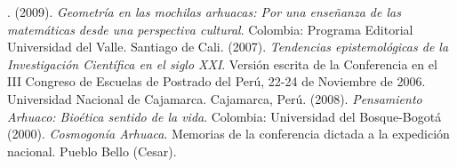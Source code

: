 \begin{titlepage}
\begin{minipage}{0.85\linewidth}
\end{minipage}
\vspace{5pt}
\begin{thebibliography}{99}
. (2009).  {\it Geometr\'ia en las mochilas arhuacas: Por una ense\~nanza de las matem\'aticas desde una perspectiva cultural}.  Colombia: Programa Editorial Universidad del Valle. Santiago de Cali.
 (2007).  {\it Tendencias epistemol\'ogicas de la Investigaci\'on Cient\'ifica en el siglo XXI}.  Versi\'on escrita de la Conferencia en el III Congreso de Escuelas de Postrado del Per\'u, 22-24 de Noviembre de 2006.  Universidad Nacional de Cajamarca.  Cajamarca, Per\'u.
  (2008).  {\it Pensamiento Arhuaco: Bio\'etica sentido de la vida}. Colombia: Universidad del Bosque-Bogot\'a
 (2000).  {\it Cosmogon\'ia Arhuaca}.  Memorias de la conferencia dictada a la expedici\'on  nacional.  Pueblo Bello (Cesar).
\end{thebibliography}
\end{titlepage}
\author{%
\vspace{2pt}\\
Ever de  la  Hoz  Molinares,\vspace{2pt} \\
  Universidad Popular del Cesar,\vspace{2pt} \\
  Valledupar, Colombia,\vspace{2pt}\\
    \hspace*{-2cm}\texttt{\scriptsize everdelahoz@unicesar.edu.co }\vspace{10pt} \\
   Omar Trujillo Varilla,\vspace{2pt} \\
   Universidad Popular del Cesar,\vspace{2pt} \\
  Valledupar, Colombia,\vspace{2pt}\\
    \hspace*{-2cm}\texttt{\scriptsize omartrujillo@unicesar.edu.co}\vspace{10pt} \\
    Carmen Morales Castro,\vspace{2pt}\\
   Liceo Nal Virginia Gil de Hermoso ,\vspace{2pt} \\
 Valledupar, Colombia,\vspace{2pt}\\
    \hspace*{-2cm}\texttt{\scriptsize clizmorales@gmail.com}\\
         }
